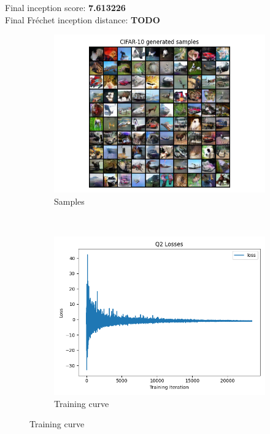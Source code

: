 \documentclass{article}
\begin{document}
Final inception score: \textbf{7.613226} \\
Final Fréchet inception distance: \textbf{TODO}
\begin{figure}[H]
    \centering
    \begin{subfigure}{0.6\textwidth}
        \centering
        \includegraphics[width=\textwidth]{figures/q2_samples.png}
        \caption{Samples}
    \end{subfigure}
    \\
    \begin{subfigure}{0.6\textwidth}
        \centering
        \includegraphics[width=\textwidth]{figures/q2_losses.png}
        \caption{Training curve}
    \end{subfigure}
    
\end{figure}
\end{document}
